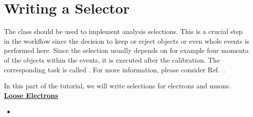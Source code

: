 \section{Writing a Selector}\label{sec:selector}

The  class should be used to implement analysis selections.
This is a crucial step in the workflow since the decision to keep or reject objects or even whole events is performed here.
Since the selection usually depends on for example four momenta of the objects within the events, it is executed after the calibration.
The corresponding task is called .
For more information, please consider Ref.~\cite{cf_repo}.

\begin{table}[t]
\end{table}
In this part of the tutorial, we will write selections for electrons and muons.
\textbf{\underline{Loose Electrons}}
\begin{itemize}
    \item
\end{itemize}

